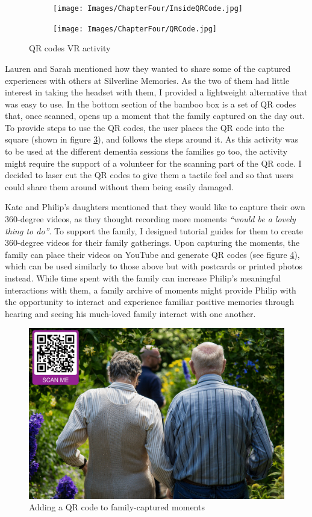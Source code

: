 \begin{figure}[htp]
\centering
\begin{subfigure}{.5\textwidth}
  \centering
  \texttt{[image: Images/ChapterFour/InsideQRCode.jpg]}
  \label{fig:insideQRBox}
\end{subfigure}%
\begin{subfigure}{.5\textwidth}
  \centering
  \texttt{[image: Images/ChapterFour/QRCode.jpg]}
  \label{fig:QRCode}
\end{subfigure}
\caption{QR codes VR activity}
\label{fig:QRcodes}
\end{figure}
Lauren and Sarah mentioned how they wanted to share some of the captured experiences with others at Silverline Memories. As the two of them had little interest in taking the headset with them, I provided a lightweight alternative that was easy to use. In the bottom section of the bamboo box is a set of QR codes that, once scanned, opens up a moment that the family captured on the day out. To provide steps to use the QR codes, the user places the QR code into the square (shown in figure \ref{fig:QRcodes}), and follows the steps around it. As this activity was to be used at the different dementia sessions the families go too, the activity might require the support of a volunteer for the scanning part of the QR code. I decided to laser cut the QR codes to give them a tactile feel and so that users could share them around without them being easily damaged.

Kate and Philip's daughters mentioned that they would like to capture their own 360-degree videos, as they thought recording more moments \textit{``would be a lovely thing to do''}. To support the family, I designed tutorial guides for them to create 360-degree videos for their family gatherings. Upon capturing the moments, the family can place their videos on YouTube and generate QR codes (see figure \ref{fig:QRCode-Captured}), which can be used similarly to those above but with postcards or printed photos instead. While time spent with the family can increase Philip’s meaningful interactions with them, a family archive of moments might provide Philip with the opportunity to interact and experience familiar positive memories through hearing and seeing his much-loved family interact with one another.

\begin{figure}[htp]
\centering
\includegraphics[width=.6\linewidth]{Images/ChapterFour/QRScanPhoto.png}
\caption{Adding a QR code to family-captured moments}
\label{fig:QRCode-Captured}
\end{figure}

